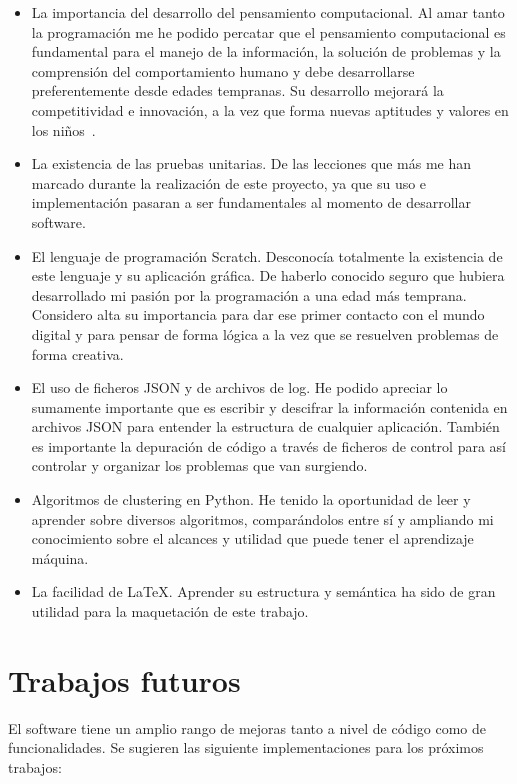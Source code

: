 \documentclass[a4paper, 12pt]{book}
\begin{document}
\begin{itemize}
\item La importancia del desarrollo del pensamiento computacional. Al amar tanto la programación me he podido percatar que el pensamiento computacional es fundamental para el manejo de la información, la solución de problemas y la comprensión del comportamiento humano y debe desarrollarse preferentemente desde edades tempranas. Su desarrollo mejorará la competitividad e innovación, a la vez que forma nuevas aptitudes y valores en los niños~\cite{wing_socialissues}.
\item La existencia de las pruebas unitarias. De las lecciones que más me han marcado durante la realización de este proyecto, ya que su uso e implementación pasaran a ser fundamentales al momento de desarrollar software.
\item El lenguaje de programación Scratch. Desconocía totalmente la existencia de este lenguaje y su aplicación gráfica. De haberlo conocido seguro que hubiera desarrollado mi pasión por la programación a una edad más temprana. Considero alta su importancia para dar ese primer contacto con el mundo digital y para pensar de forma lógica a la vez que se resuelven problemas de forma creativa.
\item El uso de ficheros JSON y de archivos de log. He podido apreciar lo sumamente importante que es escribir y descifrar la información contenida en archivos JSON para entender la estructura de cualquier aplicación. También es importante la depuración de código a través de ficheros de control para así controlar y organizar los problemas que van surgiendo.  
\item Algoritmos de clustering en Python. He tenido la oportunidad de leer y aprender sobre diversos algoritmos, comparándolos entre sí y ampliando mi conocimiento sobre el alcances y utilidad que puede tener el aprendizaje máquina. 
\item La facilidad de \LaTeX. Aprender su estructura y semántica ha sido de gran utilidad para la maquetación de este trabajo.
\end{itemize}


\section{Trabajos futuros}
\label{sec:trabajos_futuros}

El software tiene un amplio rango de mejoras tanto a nivel de código como de funcionalidades. Se sugieren las siguiente implementaciones para los próximos trabajos:
\end{document}
